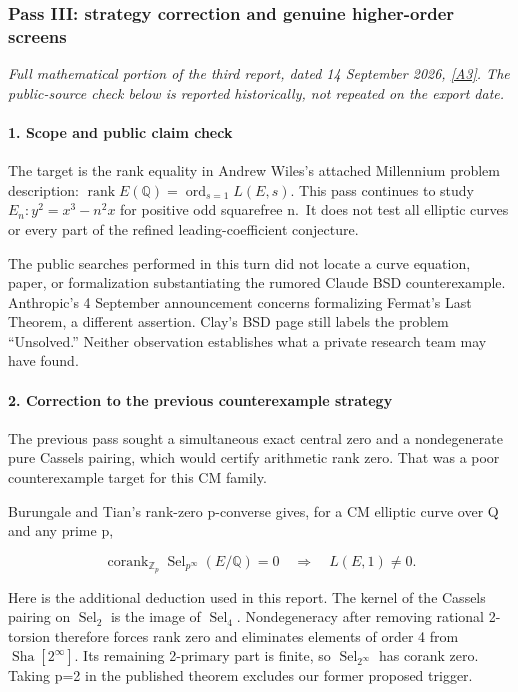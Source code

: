 \documentclass[11pt]{article}
\newcommand{\srcref}[1]{\hyperlink{source:#1}{[#1]}}
\begin{document}
\subsubsection{Pass III: strategy correction and genuine higher-order screens}\label{pass3}
\textit{Full mathematical portion of the third report, dated 14 September 2026, \srcref{A3}. The public-source check below is reported historically, not repeated on the export date.}

\paragraph{1. Scope and public claim check}

The target is the rank equality in Andrew Wiles's attached Millennium problem description: \(\operatorname{rank}E(\mathbb Q)=\operatorname{ord}_{s=1}L(E,s)\). This pass continues to study \(E_n:y^2=x^3-n^2x\) for positive odd squarefree n.~It does not test all elliptic curves or every part of the refined leading-coefficient conjecture.

The public searches performed in this turn did not locate a curve equation, paper, or formalization substantiating the rumored Claude BSD counterexample. Anthropic's 4 September announcement concerns formalizing Fermat's Last Theorem, a different assertion. Clay's BSD page still labels the problem ``Unsolved.'' Neither observation establishes what a private research team may have found.

\paragraph{2. Correction to the previous counterexample strategy}

The previous pass sought a simultaneous exact central zero and a nondegenerate pure Cassels pairing, which would certify arithmetic rank zero. That was a poor counterexample target for this CM family.

Burungale and Tian's rank-zero p-converse gives, for a CM elliptic curve over Q and any prime p,

\[\operatorname{corank}_{\mathbb Z_p}\operatorname{Sel}_{p^\infty}(E/\mathbb Q)=0\quad\Longrightarrow\quad L(E,1)\ne0.\]

Here is the additional deduction used in this report. The kernel of the Cassels pairing on \(\operatorname{Sel}_2\) is the image of \(\operatorname{Sel}_4\). Nondegeneracy after removing rational 2-torsion therefore forces rank zero and eliminates elements of order 4 from \(\operatorname{Sha}[2^\infty]\). Its remaining 2-primary part is finite, so \(\operatorname{Sel}_{2^\infty}\) has corank zero. Taking p=2 in the published theorem excludes our former proposed trigger.
\end{document}
